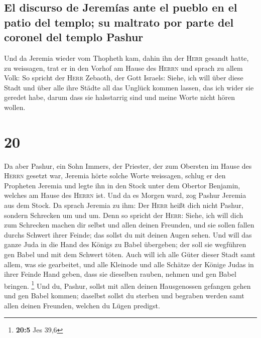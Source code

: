 \hypertarget{el-discurso-de-jeremuxedas-ante-el-pueblo-en-el-patio-del-templo-su-maltrato-por-parte-del-coronel-del-templo-pashur}{%
\subsection{El discurso de Jeremías ante el pueblo en el patio del
templo; su maltrato por parte del coronel del templo
Pashur}\label{el-discurso-de-jeremuxedas-ante-el-pueblo-en-el-patio-del-templo-su-maltrato-por-parte-del-coronel-del-templo-pashur}}

 Und da Jeremia wieder vom Thopheth kam, dahin ihn der
\textsc{Herr} gesandt hatte, zu weissagen, trat er in den Vorhof am
Hause des \textsc{Herrn} und sprach zu allem Volk:  So
spricht der \textsc{Herr} Zebaoth, der Gott Israels: Siehe, ich will
über diese Stadt und über alle ihre Städte all das Unglück kommen
lassen, das ich wider sie geredet habe, darum dass sie halsstarrig sind
und meine Worte nicht hören wollen.

\hypertarget{section-19}{%
\section{20}\label{section-19}}

 Da aber Pashur, ein Sohn Immers, der Priester, der zum
Obersten im Hause des \textsc{Herrn} gesetzt war, Jeremia hörte solche
Worte weissagen,  schlug er den Propheten Jeremia und
legte ihn in den Stock unter dem Obertor Benjamin, welches am Hause des
\textsc{Herrn} ist.  Und da es Morgen ward, zog Pashur
Jeremia aus dem Stock. Da sprach Jeremia zu ihm: Der \textsc{Herr} heißt
dich nicht Pashur, sondern Schrecken um und um.  Denn so
spricht der \textsc{Herr}: Siehe, ich will dich zum Schrecken machen dir
selbst und allen deinen Freunden, und sie sollen fallen durchs Schwert
ihrer Feinde; das sollst du mit deinen Augen sehen. Und will das ganze
Juda in die Hand des Königs zu Babel übergeben; der soll sie wegführen
gen Babel und mit dem Schwert töten.  Auch will ich alle
Güter dieser Stadt samt allem, was sie gearbeitet, und alle Kleinode und
alle Schätze der Könige Judas in ihrer Feinde Hand geben, dass sie
dieselben rauben, nehmen und gen Babel bringen. \footnote{\textbf{20:5}
  Jes 39,6}  Und du, Pashur, sollst mit allen deinen
Hausgenossen gefangen gehen und gen Babel kommen; daselbst sollst du
sterben und begraben werden samt allen deinen Freunden, welchen du Lügen
predigst.

